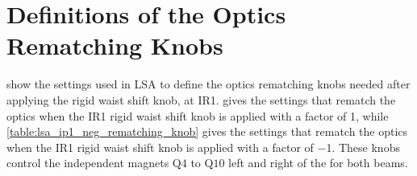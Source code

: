 
\section{Definitions of the Optics Rematching Knobs}

 show the settings used in LSA to define the optics rematching knobs needed after applying the rigid waist shift knob, at IR\num{1}.
 gives the settings that rematch the optics when the IR\num{1} rigid waist shift knob is applied with a factor of \num{1}, while \cref{table:lsa_ip1_neg_rematching_knob} gives the settings that rematch the optics when the IR\num{1} rigid waist shift knob is applied with a factor of \num{-1}.
These knobs control the independent magnets \(\mathrm{Q4}\) to \(\mathrm{Q10}\) left and right of the \IP for both beams.

